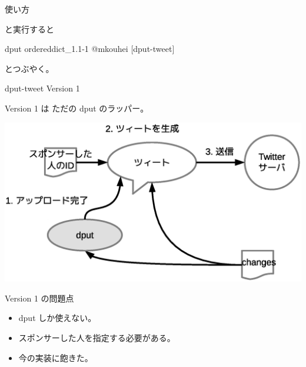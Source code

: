 \begin{frame}[containsverbatim]{使い方}
と実行すると
\begin{commandline}
dput ordereddict_1.1-1 @mkouhei [dput-tweet] 
\end{commandline}
とつぶやく。

\end{frame}

\begin{frame}{dput-tweet Version 1}

Version 1 は ただの dput のラッパー。
\begin{center}
\includegraphics[width=1.0\hsize]{image201201/debianmeeting201201-imagedata-v1.eps}
\end{center}

\end{frame}

\begin{frame}{Version 1 の問題点}
\begin{itemize}
\item dput しか使えない。
\item スポンサーした人を指定する必要がある。
\item 今の実装に飽きた。
\end{itemize}
\end{frame}

